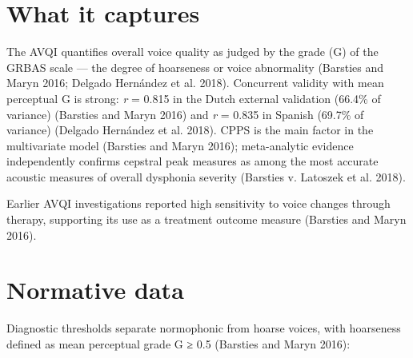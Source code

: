 \documentclass[
  english,
  letterpaper,
]{scrbook}
\begin{document}
\section{What it captures}\label{what-it-captures-1}

The AVQI quantifies overall voice quality as judged by the grade (G) of
the GRBAS scale --- the degree of hoarseness or voice abnormality
(Barsties and Maryn 2016; Delgado Hernández et al. 2018). Concurrent
validity with mean perceptual G is strong: \emph{r} = 0.815 in the Dutch
external validation (66.4\% of variance) (Barsties and Maryn 2016) and
\emph{r} = 0.835 in Spanish (69.7\% of variance) (Delgado Hernández et
al. 2018). CPPS is the main factor in the multivariate model (Barsties
and Maryn 2016); meta-analytic evidence independently confirms cepstral
peak measures as among the most accurate acoustic measures of overall
dysphonia severity (Barsties v. Latoszek et al. 2018).

Earlier AVQI investigations reported high sensitivity to voice changes
through therapy, supporting its use as a treatment outcome measure
(Barsties and Maryn 2016).

\section{Normative data}\label{normative-data-1}

Diagnostic thresholds separate normophonic from hoarse voices, with
hoarseness defined as mean perceptual grade G ≥ 0.5 (Barsties and Maryn
2016):
\end{document}
